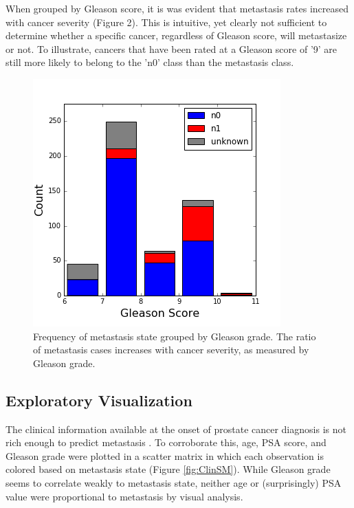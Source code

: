 \documentclass[final]{article}
\begin{document}
When grouped by Gleason score, it is was evident that metastasis rates increased
with cancer severity (Figure 2).  This is  intuitive, yet clearly
not sufficient to determine whether a specific cancer, regardless of Gleason
score, will metastasize or not.  To illustrate, cancers that have been rated at
a Gleason score of '9' are still more likely to belong to the 'n0' class than
the metastasis class.

\begin{figure}
  \centering
  \includegraphics[scale=0.5]{GleasonHist}
  \caption{Frequency of metastasis state grouped by Gleason grade.\label{fig:preGSHist}
    The ratio of metastasis cases increases with cancer severity, as measured by Gleason grade.}
\end{figure}

\subsection{Exploratory Visualization}

The clinical information available at the onset of prostate cancer diagnosis is
not rich enough to predict metastasis \cite{Brawley16}.  To corroborate this,
age, PSA score, and Gleason grade were plotted in a scatter matrix in which
each observation is colored based on metastasis state (Figure \ref{fig:ClinSM}).
While Gleason grade seems to correlate weakly to metastasis state, neither age or
(surprisingly) PSA value were proportional to metastasis by visual analysis.
\end{document}
